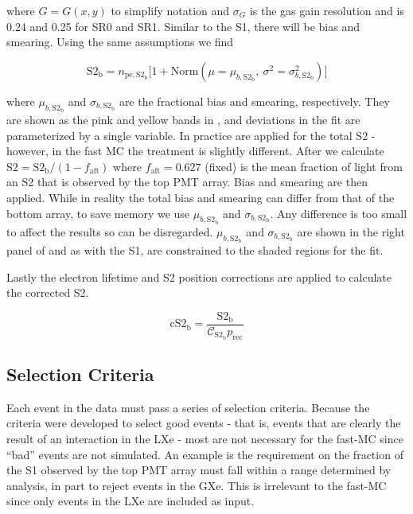 \noindent where $G = G(x, y)$ to simplify notation and $\sigma_G$ is the gas gain resolution and is 0.24 and 0.25 for SR0 and
SR1.  Similar to the S1, there will be bias and smearing.  Using the same assumptions we find

\begin{equation}
\mathrm{S2_b} = n_{\mathrm{pe,S2_b}} \Big[ 1 + \mathrm{Norm}(\mu = \mu_{b, \mathrm{S2_b}},\ \sigma^2 = \sigma_{b, \mathrm{S2_b}}^2) \Big]
\label{eq:er_nr_calibrations_parameter_determ_det_phys_s2_bias_smear}
\end{equation}

\noindent where $\mu_{b, \mathrm{S2_b}}$ and $\sigma_{b, \mathrm{S2_b}}$ are the \stwob fractional bias and smearing,
respectively.  They are shown as the pink and yellow bands in , and
deviations in the fit are parameterized by a single variable.  In
practice  are applied
for the total S2 - however, in the fast MC the treatment is slightly different.  After
 we calculate
$\mathrm{S2} = \mathrm{S2_b} / (1 - f_{\mathrm{aft}})$ where $f_{\mathrm{aft}} = 0.627$ (fixed) is the mean fraction of light from an
S2 that is observed by the top PMT array.  Bias and smearing are then applied.  While in reality the total bias and smearing
can differ from that of the bottom array, to save memory we use $\mu_{b, \mathrm{S2_b}}$ and $\sigma_{b, \mathrm{S2_b}}$.  Any
difference is too small to affect the results so can be disregarded.  $\mu_{b, \mathrm{S2_b}}$ and $\sigma_{b, \mathrm{S2_b}}$ are shown
in the right panel of  and as with the S1, are constrained to the
shaded regions for the fit.

Lastly the electron lifetime and S2 position corrections are applied to calculate the corrected S2.

\begin{equation}
\mathrm{cS2_b} = \frac{\mathrm{S2_b}}{\mathcal{C}_{\mathrm{S2_b}} p_{\mathrm{rec}}}
\end{equation}



\subsection{Selection Criteria}
\label{subsec:er_nr_calibrations_parameter_determ_cuts}
Each event in the data must pass a series of selection criteria.  Because the criteria were developed to select good events - that is,
events that are
clearly the result of an interaction in the LXe - most are not necessary for the fast-MC since ``bad'' events are not simulated.  An
example is the requirement on the fraction of the S1 observed by the top PMT array must fall within a range determined by analysis, in
part to reject events in the GXe.  This is irrelevant to the fast-MC since only events in the LXe are included as input.

